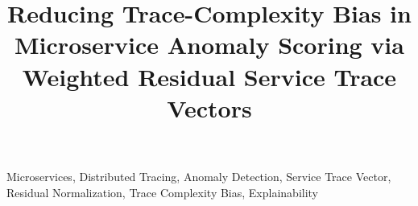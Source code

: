 \documentclass[conference]{IEEEtran}
\begin{document}

\title{Reducing Trace-Complexity Bias in Microservice Anomaly Scoring via Weighted Residual Service Trace Vectors}


\author{
\IEEEauthorblockN{} 
}

\maketitle




\begin{IEEEkeywords}
Microservices, Distributed Tracing, Anomaly Detection, Service Trace Vector, Residual Normalization, Trace Complexity Bias, Explainability
\end{IEEEkeywords}












\balance


\end{document}
